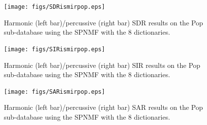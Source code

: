 \documentclass{article}
\begin{document}
\begin{figure}[h]

  \centering 
  \texttt{[image: figs/SDRismirpop.eps]}
  \caption{\label{sdrpop} Harmonic (left bar)/percussive (right bar) SDR results on the Pop sub-database using the SPNMF with the 8 dictionaries.}
  
\end{figure}\begin{figure}[h]

  \centering 
  \texttt{[image: figs/SIRismirpop.eps]}
  \caption{\label{sirpop} Harmonic (left bar)/percussive (right bar) SIR results on the Pop sub-database using the SPNMF with the 8 dictionaries.}
  
\end{figure}\begin{figure}[h]

  \centering 
  \texttt{[image: figs/SARismirpop.eps]}
  \caption{\label{sarpop} Harmonic (left bar)/percussive (right bar) SAR results on the Pop sub-database using the SPNMF with the 8 dictionaries.}
  
\end{figure}
\end{document}
